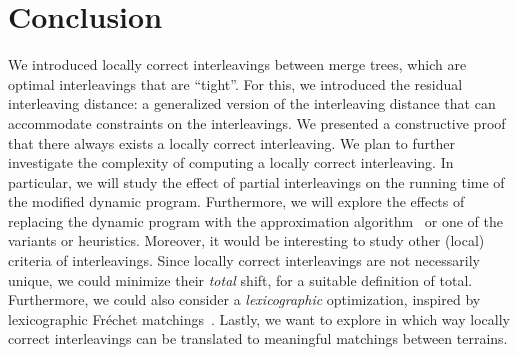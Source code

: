 \section{Conclusion}\label{sec:conclusion}
We introduced locally correct interleavings between merge trees, which are optimal interleavings that are ``tight''.
For this, we introduced the residual interleaving distance: a generalized version of the interleaving distance that can accommodate constraints on the interleavings.
We presented a constructive proof that there always exists a locally correct interleaving.
%
We plan to further investigate the complexity of computing a locally correct interleaving.
In particular, we will study the effect of partial interleavings on the running time of the modified dynamic program.
Furthermore, we will explore the effects of replacing the dynamic program with the approximation algorithm~\cite{agarwal2018computing} or one of the variants or heuristics.
Moreover, it would be interesting to study other (local) criteria of interleavings.
Since locally correct interleavings are not necessarily unique, we could minimize their \emph{total} shift, for a suitable definition of total.
Furthermore, we could also consider a \emph{lexicographic} optimization, inspired by lexicographic Fréchet matchings~\cite{rote2014lexicographic}.
Lastly, we want to explore in which way locally correct interleavings can be translated to meaningful matchings between terrains.
%
